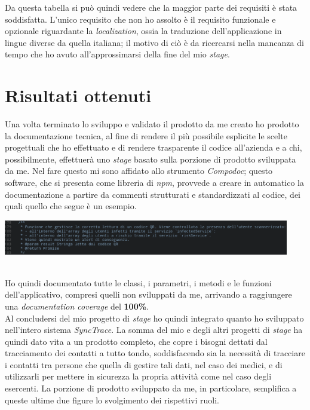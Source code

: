 Da questa tabella si può quindi vedere che la maggior parte dei requisiti è stata soddisfatta. L'unico requisito che non ho assolto è il requisito funzionale e opzionale riguardante la \textit{localization}, ossia la traduzione dell'applicazione in lingue diverse da quella italiana; il motivo di ciò è da ricercarsi nella mancanza di tempo che ho avuto all'approssimarsi della fine del mio \textit{stage}.


\section{Risultati ottenuti}

Una volta terminato lo sviluppo e validato il prodotto da me creato ho prodotto la documentazione tecnica, al fine di rendere il più possibile esplicite le scelte progettuali che ho effettuato e di rendere trasparente il codice all'azienda e a chi, possibilmente, effettuerà uno \textit{stage} basato sulla porzione di prodotto sviluppata da me. Nel fare questo mi sono affidato allo strumento \textit{Compodoc}; questo software, che si presenta come libreria di \textit{npm}, provvede a creare in automatico la documentazione a partire da commenti strutturati e standardizzati al codice, dei quali quello che segue è un esempio.\\

\begin{minipage}{\linewidth}
  \centering
    \includegraphics[height=1.5cm]{immagini/compodocdoc}
\end{minipage} \\

Ho quindi documentato tutte le classi, i parametri, i metodi e le funzioni dell'applicativo, compresi quelli non sviluppati da me, arrivando a raggiungere una \textit{documentation coverage} del \textbf{100\%}. \\

Al concludersi del mio progetto di \textit{stage} ho quindi integrato quanto ho sviluppato nell'intero sistema \textit{SyncTrace}. La somma del mio e degli altri progetti di \textit{stage} ha quindi dato vita a un prodotto completo, che copre i bisogni dettati dal tracciamento dei contatti a tutto tondo, soddisfacendo sia la necessità di tracciare i contatti tra persone che quella di gestire tali dati, nel caso dei medici, e di utilizzarli per mettere in sicurezza la propria attività come nel caso degli esercenti. La porzione di prodotto sviluppato da me, in particolare, semplifica a queste ultime due figure lo svolgimento dei rispettivi ruoli. \\
